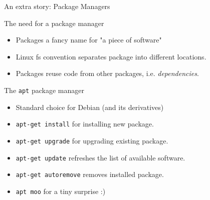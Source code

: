 \begin{frame}{An extra story: Package Managers}
\begin{block}{The need for a package manager}
	\begin{itemize}
		\item Packages a fancy name for "a piece of software"
		\item Linux fs convention separates package into different locations.
		\item Packages reuse code from other packages, i.e. \textit{dependencies}.
	\end{itemize}
\end{block}
\begin{block}{The \texttt{apt} package manager}
	\begin{itemize}
		\item Standard choice for Debian (and its derivatives)
		\item \texttt{apt-get install} for installing new package.
		\item \texttt{apt-get upgrade} for upgrading existing package.
		\item \texttt{apt-get update} refreshes the list of available software.
		\item \texttt{apt-get autoremove} removes installed package.
		\item \texttt{apt moo} for a tiny surprise :)
	\end{itemize}
\end{block}
\end{frame}



